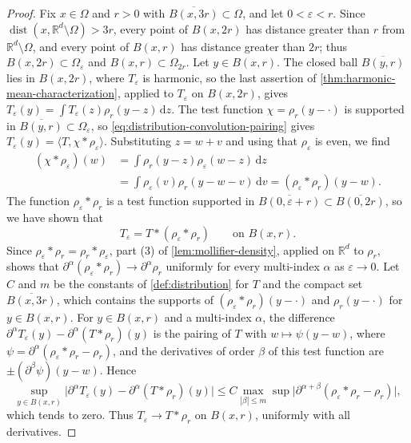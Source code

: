 \begin{proof}
Fix $x\in\Omega$ and $r>0$ with $\overline{B(x,3r)}\subset\Omega$, and let $0<\varepsilon<r$. Since $\operatorname{dist}(x,\mathbb R^d\setminus\Omega)>3r$, every point of $B(x,2r)$ has distance greater than $r$ from $\mathbb R^d\setminus\Omega$, and every point of $B(x,r)$ has distance greater than $2r$; thus $B(x,2r)\subset\Omega_\varepsilon$ and $B(x,r)\subset\Omega_{2r}$. Let $y\in B(x,r)$. The closed ball $\overline{B(y,r)}$ lies in $B(x,2r)$, where $T_\varepsilon$ is harmonic, so the last assertion of \cref{thm:harmonic-mean-characterization}, applied to $T_\varepsilon$ on $B(x,2r)$, gives $T_\varepsilon(y)=\int T_\varepsilon(z)\rho_r(y-z)\,\mathrm dz$. The test function $\chi=\rho_r(y-\cdot)$ is supported in $\overline{B(y,r)}\subset\Omega_\varepsilon$, so \eqref{eq:distribution-convolution-pairing} gives $T_\varepsilon(y)=\langle T,\chi*\rho_\varepsilon\rangle$. Substituting $z=w+v$ and using that $\rho_\varepsilon$ is even, we find
\begin{align*}
 (\chi*\rho_\varepsilon)(w)&=\int\rho_r(y-z)\rho_\varepsilon(w-z)\,\mathrm dz\\
 &=\int\rho_\varepsilon(v)\rho_r(y-w-v)\,\mathrm dv=(\rho_\varepsilon*\rho_r)(y-w).
\end{align*}
The function $\rho_\varepsilon*\rho_r$ is a test function supported in $\overline{B(0,\varepsilon+r)}\subset\overline{B(0,2r)}$, so we have shown that
\[
 T_\varepsilon=T*(\rho_\varepsilon*\rho_r)\qquad\text{on }B(x,r).
\]
Since $\rho_\varepsilon*\rho_r=\rho_r*\rho_\varepsilon$, part (3) of \cref{lem:mollifier-density}, applied on $\mathbb R^d$ to $\rho_r$, shows that $\partial^\alpha(\rho_\varepsilon*\rho_r)\to\partial^\alpha\rho_r$ uniformly for every multi-index $\alpha$ as $\varepsilon\to0$. Let $C$ and $m$ be the constants of \cref{def:distribution} for $T$ and the compact set $\overline{B(x,3r)}$, which contains the supports of $(\rho_\varepsilon*\rho_r)(y-\cdot)$ and $\rho_r(y-\cdot)$ for $y\in B(x,r)$. For $y\in B(x,r)$ and a multi-index $\alpha$, the difference $\partial^\alpha T_\varepsilon(y)-\partial^\alpha(T*\rho_r)(y)$ is the pairing of $T$ with $w\mapsto\psi(y-w)$, where $\psi=\partial^\alpha(\rho_\varepsilon*\rho_r-\rho_r)$, and the derivatives of order $\beta$ of this test function are $\pm(\partial^\beta\psi)(y-w)$. Hence
\[
 \sup_{y\in B(x,r)}\bigl|\partial^\alpha T_\varepsilon(y)-\partial^\alpha(T*\rho_r)(y)\bigr|
 \leq C\max_{|\beta|\leq m}\sup\bigl|\partial^{\alpha+\beta}(\rho_\varepsilon*\rho_r-\rho_r)\bigr|,
\]
which tends to zero. Thus $T_\varepsilon\to T*\rho_r$ on $B(x,r)$, uniformly with all derivatives.


\end{proof}
